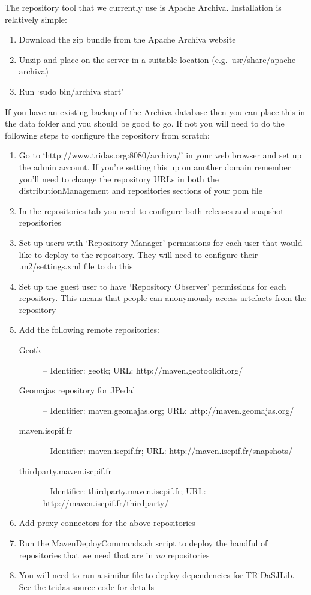 The repository tool that we currently use is Apache Archiva.  Installation is relatively simple:

\begin{enumerate}
 \item Download the zip bundle from the Apache Archiva website
 \item Unzip and place on the server in a suitable location (e.g.\ usr/share/apache-archiva)
 \item Run `sudo bin/archiva start'
\end{enumerate}

If you have an existing backup of the Archiva database then you can place this in the data folder and you should be good to go.  If not you will need to do the following steps to configure the repository from scratch:

\begin{enumerate}
 \item Go to `http://www.tridas.org:8080/archiva/' in your web browser and set up the admin account.  If you're setting this up on another domain remember you'll need to change the repository URLs in both the distributionManagement and repositories sections of your pom file
 \item In the repositories tab you need to configure both releases and snapshot repositories
 \item Set up users with `Repository Manager' permissions for each user that would like to deploy to the repository.  They will need to configure their .m2/settings.xml file to do this
 \item Set up the guest user to have `Repository Observer' permissions for each repository.  This means that people can anonymously access artefacts from the repository
 \item Add the following remote repositories:
      \begin{description}
       \item[Geotk] -- Identifier: geotk; URL: http://maven.geotoolkit.org/
       \item[Geomajas repository for JPedal] -- Identifier: maven.geomajas.org; URL: http://maven.geomajas.org/
       \item[maven.iscpif.fr] -- Identifier: maven.iscpif.fr; URL: http://maven.iscpif.fr/snapshots/
       \item[thirdparty.maven.iscpif.fr] -- Identifier: thirdparty.maven.iscpif.fr; URL: http://maven.iscpif.fr/thirdparty/
      \end{description}
 \item Add proxy connectors for the above repositories
 \item Run the MavenDeployCommands.sh script to deploy the handful of repositories that we need that are in \emph{no} repositories 
 \item You will need to run a similar file to deploy dependencies for TRiDaSJLib.  See the tridas source code for details
\end{enumerate}

